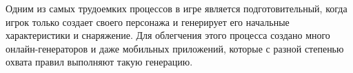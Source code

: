 Одним из самых трудоемких процессов в игре является подготовительный, когда игрок только создает своего персонажа и генерирует его начальные характеристики и снаряжение. Для облегчения этого процесса создано много онлайн-генераторов и даже мобильных приложений, которые с разной степенью охвата правил выполняют такую генерацию.